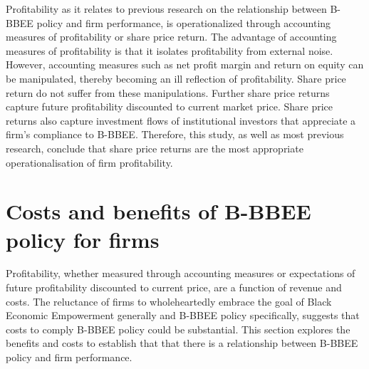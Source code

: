 Profitability as it relates to previous research on the relationship between B-BBEE policy and firm performance, is operationalized through accounting measures of profitability or share price return. The advantage of accounting measures of profitability is that it isolates profitability from external noise. However, accounting measures such as net profit margin and return on equity can be manipulated, thereby becoming an ill reflection of profitability. Share price return do not suffer from these manipulations. Further share price returns capture future profitability discounted to current market price. Share price returns also capture investment flows of institutional investors that appreciate a firm’s compliance to B-BBEE. Therefore, this study, as well as most previous research, conclude that share price returns are the most appropriate operationalisation of firm profitability.
\section{Costs and benefits of B-BBEE policy for firms}
Profitability, whether measured through accounting measures or expectations of future profitability discounted to current price, are a function of revenue and costs. The reluctance of firms to wholeheartedly embrace the goal of Black Economic Empowerment generally and B-BBEE policy specifically, suggests that costs to comply B-BBEE policy could be substantial. This section explores the benefits and costs to establish that that there is a relationship between B-BBEE policy and firm performance. 
